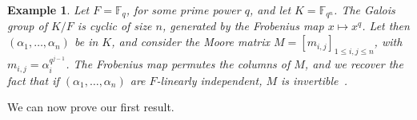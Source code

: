 \documentclass[12pt]{article}
\theoremstyle{plain}
\newtheorem{theorem}{Theorem}
\newtheorem{example}[theorem]{Example}
\newcommand{\F}{\ensuremath{\mathbb{F}}}
\begin{document}
\begin{example}\label{ex:Moore}
  Let $F=\F_q$, for some prime power $q$, and let $K=\F_{q^n}$.  The
  Galois group of $K/F$ is cyclic of size $n$, generated by the Frobenius
  map $x \mapsto x^q$. Let then $(\alpha_1,\dots,\alpha_n)$ be in $K$,
  and consider the {\em Moore matrix} $M=[m_{i,j}]_{1 \le i,j \le n}$, with
  $m_{i,j} = \alpha_i^{q^{j-1}}$. The Frobenius map permutes the
  columns of $M$, and we recover the fact that if
  $(\alpha_1,\dots,\alpha_n)$ are $F$-linearly independent, $M$ is
  invertible~\cite[Corollary~1.3.4]{Goss}.
\end{example}


We can now prove our first result.

\end{document}
